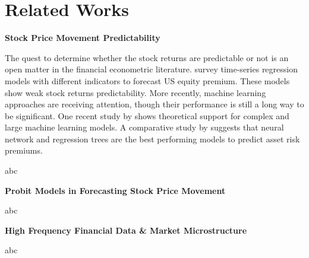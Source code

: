 \chapter{Related Works}\label{chap:relatedwork}

{\bfseries Stock Price Movement Predictability}

The quest to determine whether the stock returns are predictable or not is an open matter in the financial econometric literature. \citet{rapach_forecasting_2013} survey time-series regression models with different indicators to forecast US equity premium. These models show weak stock returns predictability. More recently, machine learning approaches are receiving attention, though their performance is still a long way to be significant. One recent study by \citet{kelly_virtue_2024} shows theoretical support for complex and large machine learning models. A comparative study by \citet{gu_empirical_2020} suggests that neural network and regression trees are the best performing models to predict asset risk premiums. 

\noindent abc

\par
{\noindent\bfseries Probit Models in Forecasting Stock Price Movement}

abc

\par

{\noindent\bfseries High Frequency Financial Data \& Market Microstructure}

abc